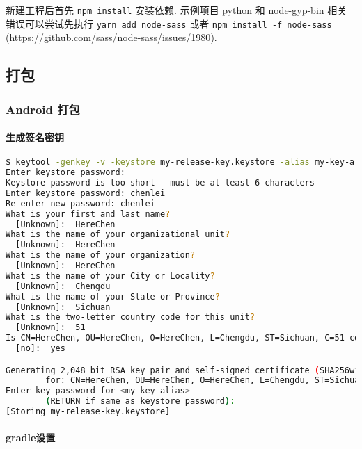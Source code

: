 新建工程后首先 \lstinline!npm install! 安装依赖. 示例项目 python 和
node-gyp-bin 相关错误可以尝试先执行 \lstinline!yarn add node-sass! 或者
\lstinline!npm install -f node-sass!
(\url{https://github.com/sass/node-sass/issues/1980}).

\subsection{打包}\label{ux6253ux5305}

\subsubsection{Android 打包}\label{android-ux6253ux5305}

\paragraph{生成签名密钥}\label{ux751fux6210ux7b7eux540dux5bc6ux94a5}

\begin{lstlisting}[language=bash]
$ keytool -genkey -v -keystore my-release-key.keystore -alias my-key-alias -keyalg RSA -keysize 2048 -validity 10000
Enter keystore password:
Keystore password is too short - must be at least 6 characters
Enter keystore password: chenlei
Re-enter new password: chenlei
What is your first and last name?
  [Unknown]:  HereChen
What is the name of your organizational unit?
  [Unknown]:  HereChen
What is the name of your organization?
  [Unknown]:  HereChen
What is the name of your City or Locality?
  [Unknown]:  Chengdu
What is the name of your State or Province?
  [Unknown]:  Sichuan
What is the two-letter country code for this unit?
  [Unknown]:  51
Is CN=HereChen, OU=HereChen, O=HereChen, L=Chengdu, ST=Sichuan, C=51 correct?
  [no]:  yes

Generating 2,048 bit RSA key pair and self-signed certificate (SHA256withRSA) with a validity of 10,000 days
        for: CN=HereChen, OU=HereChen, O=HereChen, L=Chengdu, ST=Sichuan, C=51
Enter key password for <my-key-alias>
        (RETURN if same as keystore password):
[Storing my-release-key.keystore]
\end{lstlisting}

\paragraph{gradle设置}\label{gradleux8bbeux7f6e}

